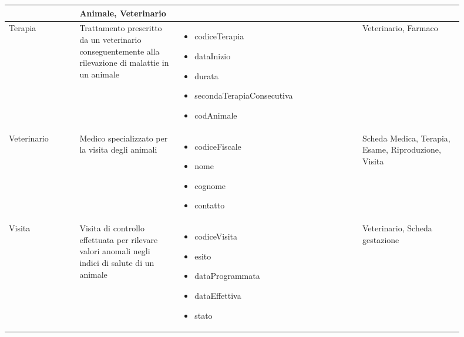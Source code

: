 \documentclass[12pt,a4paper]{article}
\begin{document}
\begin{center}
\begin{longtable}{|p{0.14\linewidth}|p{0.20\linewidth}|p{0.36\linewidth}|p{0.20\linewidth}|}
\begin{itemize}
						
					\end{itemize}
					&  Animale, Veterinario  \\ 

\hline
Terapia				 	&  Trattamento prescritto da un veterinario conseguentemente alla rilevazione di malattie in un animale 
					& \begin{itemize}
						\setlength{\itemindent}{-1em}
						\vspace{-25pt}
						\setlength\itemsep{-0.25em}
						\item codiceTerapia
						\item dataInizio
						\item durata
						\item secondaTerapiaConse\-cutiva
						
						\item codAnimale
					\end{itemize}
					&  Veterinario, Farmaco\  \\ 

\hline
Veterinario				 	&  Medico specializzato per la visita degli animali 
					& \begin{itemize}
						\setlength{\itemindent}{-1em}
						\vspace{-25pt}
						\setlength\itemsep{-0.25em}
						\item codiceFiscale
						\item nome
						\item cognome
						\item contatto
					\end{itemize}
					&  Scheda Medica, Terapia, Esame, Riproduzione, Visita  \\ 

\hline
Visita				 	&  Visita di controllo effettuata per rilevare valori anomali negli indici di salute di un animale 
					& \begin{itemize}
						\setlength{\itemindent}{-1em}
						\vspace{-25pt}
						\setlength\itemsep{-0.25em}
						\item codiceVisita
						\item esito
						\item dataProgrammata
						\item dataEffettiva
						\item stato
						
						
					\end{itemize}
					&  Veterinario, Scheda gestazione  \\ 

\hline


\end{longtable}
\end{center}
\pagebreak
\end{document}
